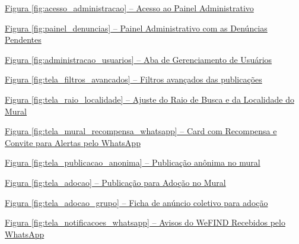 \noindent \hyperref[fig:acesso_administracao]{Figura \ref*{fig:acesso_administracao} -- Acesso ao Painel Administrativo \dotfill \pageref{fig:acesso_administracao}}\par\vspace{0.12cm}
\noindent \hyperref[fig:painel_denuncias]{Figura \ref*{fig:painel_denuncias} -- Painel Administrativo com as Denúncias Pendentes \dotfill \pageref{fig:painel_denuncias}}\par\vspace{0.12cm}
\noindent \hyperref[fig:administracao_usuarios]{Figura \ref*{fig:administracao_usuarios} -- Aba de Gerenciamento de Usuários \dotfill \pageref{fig:administracao_usuarios}}\par\vspace{0.12cm}
\noindent \hyperref[fig:tela_filtros_avancados]{Figura \ref*{fig:tela_filtros_avancados} -- Filtros avançados das publicações \dotfill \pageref{fig:tela_filtros_avancados}}\par\vspace{0.12cm}
\noindent \hyperref[fig:tela_raio_localidade]{Figura \ref*{fig:tela_raio_localidade} -- Ajuste do Raio de Busca e da Localidade do Mural \dotfill \pageref{fig:tela_raio_localidade}}\par\vspace{0.12cm}
\noindent \hyperref[fig:tela_mural_recompensa_whatsapp]{Figura \ref*{fig:tela_mural_recompensa_whatsapp} -- Card com Recompensa e Convite para Alertas pelo WhatsApp \dotfill \pageref{fig:tela_mural_recompensa_whatsapp}}\par\vspace{0.12cm}
\noindent \hyperref[fig:tela_publicacao_anonima]{Figura \ref*{fig:tela_publicacao_anonima} -- Publicação anônima no mural \dotfill \pageref{fig:tela_publicacao_anonima}}\par\vspace{0.12cm}
\noindent \hyperref[fig:tela_adocao]{Figura \ref*{fig:tela_adocao} -- Publicação para Adoção no Mural \dotfill \pageref{fig:tela_adocao}}\par\vspace{0.12cm}
\noindent \hyperref[fig:tela_adocao_grupo]{Figura \ref*{fig:tela_adocao_grupo} -- Ficha de anúncio coletivo para adoção \dotfill \pageref{fig:tela_adocao_grupo}}\par\vspace{0.12cm}
\noindent \hyperref[fig:tela_notificacoes_whatsapp]{Figura \ref*{fig:tela_notificacoes_whatsapp} -- Avisos do WeFIND Recebidos pelo WhatsApp \dotfill \pageref{fig:tela_notificacoes_whatsapp}}\par\vspace{0.12cm}

\clearpage
